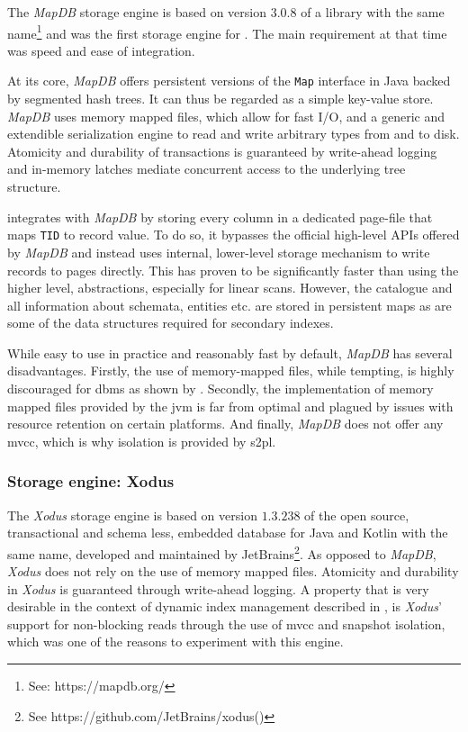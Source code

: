 The \emph{MapDB} storage engine is based on version $3.0.8$ of a library with the same name\footnote{See: https://mapdb.org/} and was the first storage engine for \cottontail{}. The main requirement at that time was speed and ease of integration.

At its core, \emph{MapDB} offers persistent versions of the \texttt{Map} interface in Java backed by segmented hash trees. It can thus be regarded as a simple key-value store. \emph{MapDB} uses memory mapped files, which allow for fast I/O, and a generic and extendible serialization engine to read and write arbitrary types from and to disk. Atomicity and durability of transactions is guaranteed by write-ahead logging and in-memory latches mediate concurrent access to the underlying tree structure.

\cottontail{} integrates with \emph{MapDB} by storing every column in a dedicated page-file that maps \texttt{TID} to record value. To do so, it bypasses the official high-level APIs offered by \emph{MapDB} and instead uses internal, lower-level storage mechanism to write records to pages directly. This has proven to be significantly faster than using the higher level, abstractions, especially for linear scans. However, the catalogue and all information about schemata, entities etc. are stored in persistent maps as are some of the data structures required for secondary indexes.

While easy to use in practice and reasonably fast by default, \emph{MapDB} has several disadvantages. Firstly, the use of memory-mapped files, while tempting, is highly discouraged for \acrshort{dbms} as shown by \cite{Crotty:2022Are}. Secondly, the implementation of memory mapped files provided by the \acrshort{jvm} is far from optimal and plagued by issues with resource retention on certain platforms. And finally, \emph{MapDB} does not offer any \acrshort{mvcc}, which is why isolation is provided by \acrshort{s2pl}.

\subsubsection{Storage engine: Xodus}
The \emph{Xodus} storage engine is based on version $1.3.238$ of the open source, transactional and schema less, embedded database for Java and Kotlin with the same name, developed and maintained by JetBrains\footnote{See https://github.com/JetBrains/xodus()}. As opposed to \emph{MapDB}, \emph{Xodus} does not rely on the use of memory mapped files. Atomicity and durability in \emph{Xodus} is guaranteed through write-ahead logging. A property that is very desirable in the context of dynamic index management described in , is \emph{Xodus}' support for non-blocking reads through the use of \acrshort{mvcc} and snapshot isolation, which was one of the reasons to experiment with this engine.


